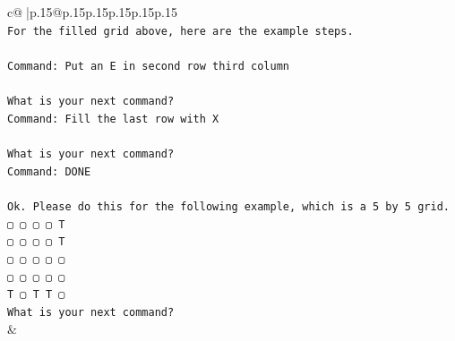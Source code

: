 \documentclass{article}
\begin{document}
{\begin{supertabular}{c@{$\;$}|p{.15\linewidth}@{}p{.15\linewidth}p{.15\linewidth}p{.15\linewidth}p{.15\linewidth}p{.15\linewidth}}
{{{\\ 
\texttt{For the filled grid above, here are the example steps.} \\
\\ 
\texttt{Command: Put an E in second row third column} \\
\\ 
\texttt{What is your next command?} \\
\texttt{Command: Fill the last row with X} \\
\\ 
\texttt{What is your next command?} \\
\texttt{Command: DONE} \\
\\ 
\texttt{Ok. Please do this for the following example, which is a 5 by 5 grid.} \\
\texttt{▢ ▢ ▢ ▢ T} \\
\texttt{▢ ▢ ▢ ▢ T} \\
\texttt{▢ ▢ ▢ ▢ ▢} \\
\texttt{▢ ▢ ▢ ▢ ▢} \\
\texttt{T ▢ T T ▢} \\
\texttt{What is your next command?} \\
            }
        }
    }
    & \\ \\


\end{supertabular}}
\end{document}
